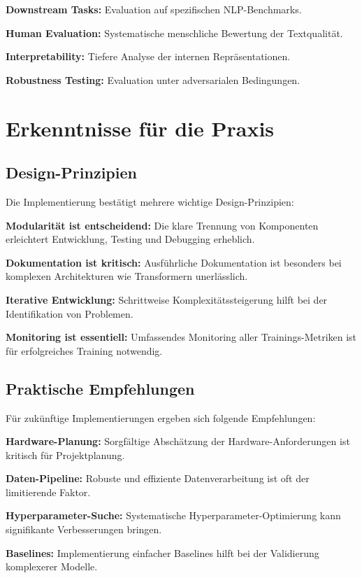 \textbf{Downstream Tasks:} Evaluation auf spezifischen NLP-Benchmarks.

\textbf{Human Evaluation:} Systematische menschliche Bewertung der Textqualität.

\textbf{Interpretability:} Tiefere Analyse der internen Repräsentationen.

\textbf{Robustness Testing:} Evaluation unter adversarialen Bedingungen.

\section{Erkenntnisse für die Praxis}

\subsection{Design-Prinzipien}

Die Implementierung bestätigt mehrere wichtige Design-Prinzipien:

\textbf{Modularität ist entscheidend:} Die klare Trennung von Komponenten erleichtert Entwicklung, Testing und Debugging erheblich.

\textbf{Dokumentation ist kritisch:} Ausführliche Dokumentation ist besonders bei komplexen Architekturen wie Transformern unerlässlich.

\textbf{Iterative Entwicklung:} Schrittweise Komplexitätssteigerung hilft bei der Identifikation von Problemen.

\textbf{Monitoring ist essentiell:} Umfassendes Monitoring aller Trainings-Metriken ist für erfolgreiches Training notwendig.

\subsection{Praktische Empfehlungen}

Für zukünftige Implementierungen ergeben sich folgende Empfehlungen:

\textbf{Hardware-Planung:} Sorgfältige Abschätzung der Hardware-Anforderungen ist kritisch für Projektplanung.

\textbf{Daten-Pipeline:} Robuste und effiziente Datenverarbeitung ist oft der limitierende Faktor.

\textbf{Hyperparameter-Suche:} Systematische Hyperparameter-Optimierung kann signifikante Verbesserungen bringen.

\textbf{Baselines:} Implementierung einfacher Baselines hilft bei der Validierung komplexerer Modelle.

